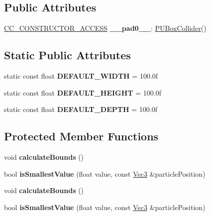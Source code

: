 \subsection*{Public Attributes}
\begin{DoxyCompactItemize}
\item 
\mbox{\label{classPUBoxCollider_a1920862f03572cf5ff0d8780bb845a12}} 
\hyperlink{_2cocos2d_2cocos_2base_2ccConfig_8h_a25ef1314f97c35a2ed3d029b0ead6da0}{C\+C\+\_\+\+C\+O\+N\+S\+T\+R\+U\+C\+T\+O\+R\+\_\+\+A\+C\+C\+E\+SS} {\bfseries \+\_\+\+\_\+pad0\+\_\+\+\_\+}\+: \hyperlink{classPUBoxCollider}{P\+U\+Box\+Collider}()
\end{DoxyCompactItemize}
\subsection*{Static Public Attributes}
\begin{DoxyCompactItemize}
\item 
\mbox{\label{classPUBoxCollider_a8dc266b89236f7cafa667775801cbf08}} 
static const float {\bfseries D\+E\+F\+A\+U\+L\+T\+\_\+\+W\+I\+D\+TH} = 100.\+0f
\item 
\mbox{\label{classPUBoxCollider_a042746e731e83eb68a2c9e07ea5ff95d}} 
static const float {\bfseries D\+E\+F\+A\+U\+L\+T\+\_\+\+H\+E\+I\+G\+HT} = 100.\+0f
\item 
\mbox{\label{classPUBoxCollider_a5d875efdbe37cb47549bd28388d10e22}} 
static const float {\bfseries D\+E\+F\+A\+U\+L\+T\+\_\+\+D\+E\+P\+TH} = 100.\+0f
\end{DoxyCompactItemize}
\subsection*{Protected Member Functions}
\begin{DoxyCompactItemize}
\item 
\mbox{\label{classPUBoxCollider_adbeb590f227aa698480a660426154031}} 
void {\bfseries calculate\+Bounds} ()
\item 
\mbox{\label{classPUBoxCollider_adb6f1269015d208cacb890e8bfbd7065}} 
bool {\bfseries is\+Smallest\+Value} (float value, const \hyperlink{classVec3}{Vec3} \&particle\+Position)
\item 
\mbox{\label{classPUBoxCollider_adbeb590f227aa698480a660426154031}} 
void {\bfseries calculate\+Bounds} ()
\item 
\mbox{\label{classPUBoxCollider_adb6f1269015d208cacb890e8bfbd7065}} 
bool {\bfseries is\+Smallest\+Value} (float value, const \hyperlink{classVec3}{Vec3} \&particle\+Position)
\end{DoxyCompactItemize}
